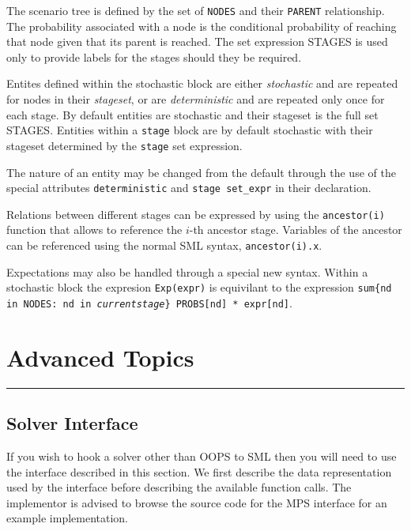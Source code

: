 \documentclass[10pt,a4paper]{book}
\begin{document}
The scenario tree is defined by the set of {\tt NODES} and their {\tt PARENT}
relationship. The probability associated with a node is the conditional
probability of reaching that node given that its parent is reached. The
set expression STAGES is used only to provide labels for the stages should
they be required.

Entites defined within the stochastic block are either {\it stochastic} and
are repeated for nodes in their {\it stageset}, or are {\it deterministic} and
are repeated only once for each stage. By default entities are stochastic
and their stageset is the full set STAGES. Entities within a {\tt stage} block
are by default stochastic with their stageset determined by the {\tt stage} set
expression.

The nature of an entity may be changed from the default through the use of the
special attributes {\tt deterministic} and {\tt stage set\_expr} in their
declaration.

Relations between different stages can be expressed by using the 
{\tt ancestor(i)} function that allows to reference the $i$-th ancestor
stage. Variables of the ancestor can be referenced using the normal SML syntax,
{\tt ancestor(i).x}.

Expectations may also be handled through a special new syntax. Within a
stochastic block the expresion {\tt Exp(expr)} is equivilant to the expression
{\tt sum\{nd in NODES: nd in \textit{currentstage}\} PROBS[nd] * expr[nd]}.

\chapter{Advanced Topics}
\vspace{-0.6cm}\rule{\textwidth}{0.4ex}\vspace{0.1cm}

\section{Solver Interface}
\label{interface}

If you wish to hook a solver other than OOPS to SML then you will need to use
the interface described in this section. We first describe the data
representation used by the interface before describing the available function
calls. The implementor is advised to browse the source code for the MPS
interface for an example implementation.
\end{document}
